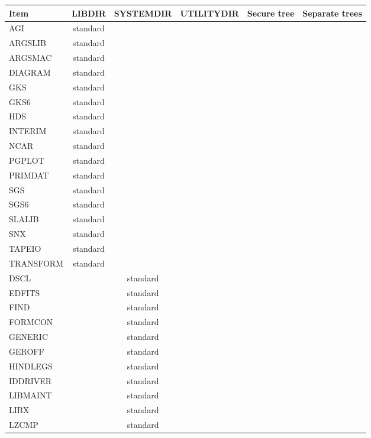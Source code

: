 {\scriptsize
\begin{table}
\begin{center}
\begin{tabular}{||l||c|c|c||c||c||} \hline
{\bf Item} & {\bf LIBDIR} & {\bf SYSTEMDIR} &  {\bf UTILITYDIR} &
{\bf Secure tree} & {\bf Separate trees} \\
\hline
\hline
AGI       & standard &   &   &   &   \\
ARGSLIB   & standard &   &   &   &   \\
ARGSMAC   & standard &   &   &   &   \\
DIAGRAM   & standard &   &   &   &   \\
GKS       & standard &   &   &   &   \\
GKS6      & standard &   &   &   &   \\
HDS       & standard &   &   &   &   \\
INTERIM   & standard &   &   &   &   \\
NCAR      & standard &   &   &   &   \\
PGPLOT    & standard &   &   &   &   \\
PRIMDAT   & standard &   &   &   &   \\
SGS       & standard &   &   &   &   \\
SGS6      & standard &   &   &   &   \\
SLALIB    & standard &   &   &   &   \\
SNX       & standard &   &   &   &   \\
TAPEIO    & standard &   &   &   &   \\
TRANSFORM & standard &   &   &   &   \\
\hline
DSCL      &   & standard &   &   &   \\
EDFITS    &   & standard &   &   &   \\
FIND      &   & standard &   &   &   \\
FORMCON   &   & standard &   &   &   \\
GENERIC   &   & standard &   &   &   \\
GEROFF    &   & standard &   &   &   \\
HINDLEGS  &   & standard &   &   &   \\
IDDRIVER  &   & standard &   &   &   \\
LIBMAINT  &   & standard &   &   &   \\
LIBX      &   & standard &   &   &   \\
LZCMP     &   & standard &   &   &   \\

\end{tabular}
\end{center}
\end{table}}
